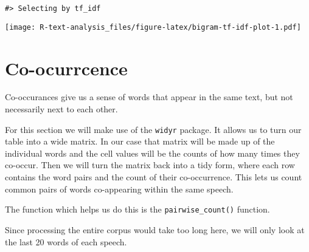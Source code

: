 \documentclass[]{book}
\newenvironment{Shaded}{\begin{snugshade}}{\end{snugshade}}
\newcommand{\CommentTok}[1]{\textcolor[rgb]{0.56,0.35,0.01}{\textit{#1}}}
\newcommand{\DataTypeTok}[1]{\textcolor[rgb]{0.13,0.29,0.53}{#1}}
\newcommand{\DecValTok}[1]{\textcolor[rgb]{0.00,0.00,0.81}{#1}}
\newcommand{\KeywordTok}[1]{\textcolor[rgb]{0.13,0.29,0.53}{\textbf{#1}}}
\newcommand{\NormalTok}[1]{#1}
\newcommand{\OperatorTok}[1]{\textcolor[rgb]{0.81,0.36,0.00}{\textbf{#1}}}
\newcommand{\OtherTok}[1]{\textcolor[rgb]{0.56,0.35,0.01}{#1}}
\newcommand{\StringTok}[1]{\textcolor[rgb]{0.31,0.60,0.02}{#1}}
\begin{document}
\begin{verbatim}
#> Selecting by tf_idf
\end{verbatim}

\texttt{[image: R-text-analysis\_files/figure-latex/bigram-tf-idf-plot-1.pdf]}

\hypertarget{co-ocurrcence}{%
\section{Co-ocurrcence}\label{co-ocurrcence}}

Co-occurances give us a sense of words that appear in the same text, but not necessarily next to each other.

For this section we will make use of the \texttt{widyr} package. It allows us to turn our table into a wide matrix. In our case that matrix will be made up of the individual words and the cell values will be the counts of how many times they co-occur. Then we will turn the matrix back into a tidy form, where each row contains the word pairs and the count of their co-occurrence. This lets us count common pairs of words co-appearing within the same speech.

The function which helps us do this is the \texttt{pairwise\_count()} function.

Since processing the entire corpus would take too long here, we will only look at the last 20 words of each speech.

\begin{Shaded}
\end{Shaded}
\end{document}
